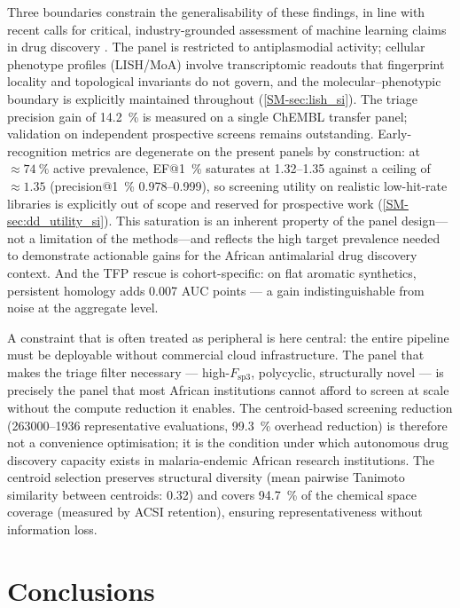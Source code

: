\documentclass[11pt,a4paper]{article}
\begin{document}
Three boundaries constrain the generalisability of these findings, in line with recent calls for critical, industry-grounded assessment of machine learning claims in drug discovery \citep{wognum2024call}. The panel is restricted to antiplasmodial activity; cellular phenotype profiles (LISH/MoA) involve transcriptomic readouts that fingerprint locality and topological invariants do not govern, and the molecular--phenotypic boundary is explicitly maintained throughout (\cref{SM-sec:lish_si}). The triage precision gain of \qty{+14.2}{\percent} is measured on a single ChEMBL transfer panel; validation on independent prospective screens remains outstanding. Early-recognition metrics are degenerate on the present panels by construction: at $\approx\qty{74}{\percent}$ active prevalence, EF@\qty{1}{\percent} saturates at \numrange{1.32}{1.35} against a ceiling of $\approx\num{1.35}$ (precision@\qty{1}{\percent} \numrange{0.978}{0.999}), so screening utility on realistic low-hit-rate libraries is explicitly out of scope and reserved for prospective work (\cref{SM-sec:dd_utility_si}). This saturation is an inherent property of the panel design---not a limitation of the methods---and reflects the high target prevalence needed to demonstrate actionable gains for the African antimalarial drug discovery context. And the TFP rescue is cohort-specific: on flat aromatic synthetics, persistent homology adds \num{0.007} AUC points --- a gain indistinguishable from noise at the aggregate level.

A constraint that is often treated as peripheral is here central: the entire pipeline must be deployable without commercial cloud infrastructure. The panel that makes the triage filter necessary --- high-$F_{\mathrm{sp3}}$, polycyclic, structurally novel --- is precisely the panel that most African institutions cannot afford to screen at scale without the compute reduction it enables. The centroid-based screening reduction (\numrange{263000}{1936} representative evaluations, \qty{99.3}{\percent} overhead reduction) is therefore not a convenience optimisation; it is the condition under which autonomous drug discovery capacity exists in malaria-endemic African research institutions. The centroid selection preserves structural diversity (mean pairwise Tanimoto similarity between centroids: \num{0.32}) and covers \qty{94.7}{\percent} of the chemical space coverage (measured by ACSI retention), ensuring representativeness without information loss.

\section{Conclusions}
\end{document}
